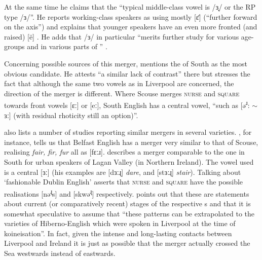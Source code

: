 At the same time he claims that the ``typical middle-class vowel is /ɜ̟/ or the RP type /ɜ/''. He reports working-class speakers as using mostly [ɛ̈] (``further forward on the axis'') and explains that younger speakers have an even more fronted (and raised) [ë] \citep[271]{knowles1973}.
He adds that /ɜ/ in particular ``merits further study for various age-groups and in various parts of '' \citeyearpar[320]{knowles1973}.

Concerning possible sources of this merger, \citet[128]{honeybone2007} mentions the  of South  as the most obvious candidate.
He attests ``a similar lack of contrast'' there but stresses the fact that although the same two vowels as in Liverpool are concerned, the direction of the merger is different.
Where Scouse merges \textsc{nurse} and \textsc{square} towards front vowels [ɛː] or [eː], South  English has a central vowel, ``such as [ə\textsuperscript{ɹ}: \(\sim\) ɜː] (with residual rhoticity still an option)''.

\parencite{honeybone2007} also lists a number of studies reporting similar mergers in several  varieties.
\citet{wells1982}, for instance, tells us that Belfast English has a merger very similar to that of Scouse, realising \emph{fair, fir, fur} all as [fɛːɹ].
\citet[cf.][48]{harris1985} describes a merger comparable to the one in South  for urban speakers of Lagan Valley (in Northern Ireland).
The vowel used is a central [ɜː] (his examples are [dɜːɻ] \emph{dare}, and [stɜːɻ] \emph{stair}).
Talking about `fashionable Dublin English' \citet{hickey1999} asserts that \textsc{nurse} and \textsc{square} have the possible realisations [nə\textsuperscript{ɻ}s] and [skwə\textsuperscript{ɻ}] respectively.
\parencite[128]{honeybone2007} points out that these are statements about current (or comparatively recent) stages of the respective s and that it is somewhat speculative to assume that ``these patterns can be extrapolated to the varieties of Hiberno-English which were spoken in Liverpool at the time of koineisation''.
In fact, given the intense and long-lasting contacts between Liverpool and Ireland it is just as possible that the merger actually crossed the  Sea westwards instead of eastwards.


